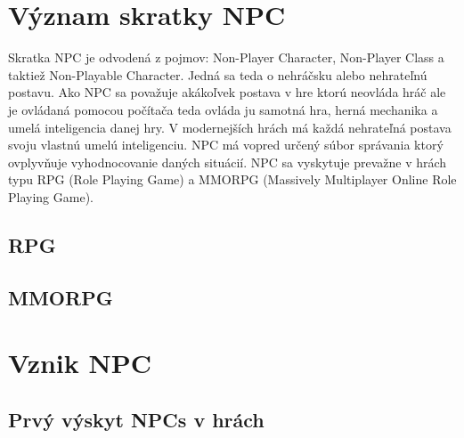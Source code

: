 \documentclass[10pt,twoside,slovak,a4paper]{article}
\begin{document}
\section{Význam skratky NPC}  \label{Vyznam skratky}
Skratka NPC je odvodená z pojmov: Non-Player Character, Non-Player Class a taktiež Non-Playable Character. Jedná sa teda o nehráčsku alebo nehrateľnú postavu. Ako NPC sa považuje akákoľvek postava v hre ktorú neovláda hráč ale je ovládaná pomocou počítača teda ovláda ju samotná hra, herná mechanika a umelá inteligencia danej hry. V modernejších hrách má každá nehrateľná postava svoju vlastnú umelú inteligenciu. NPC má vopred určený súbor správania ktorý ovplyvňuje vyhodnocovanie daných situácií. NPC sa vyskytuje prevažne v hrách typu RPG (Role Playing Game) a MMORPG (Massively Multiplayer Online Role Playing Game).

\subsection{RPG} \label{RPG}

\subsection{MMORPG} \label{MMORPG}

\section{Vznik NPC}
\subsection{Prvý výskyt NPCs v hrách } \label{NPC 1 time}
\end{document}
